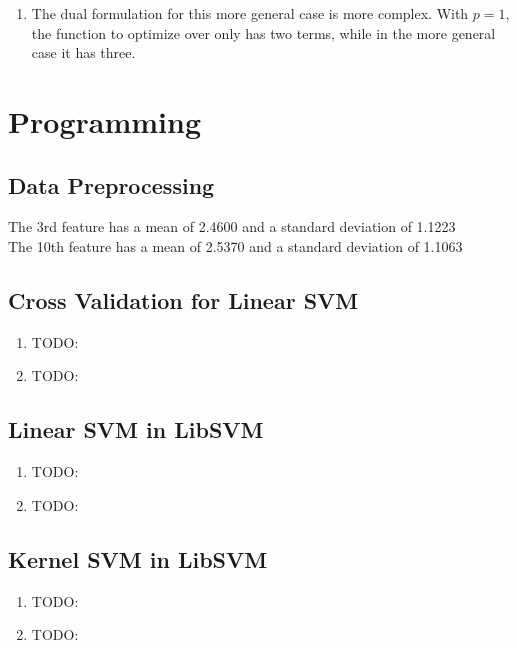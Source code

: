 \documentclass[12pt]{article}
\begin{document}
\begin{enumerate}[label=\alph*.]
	\item The dual formulation for this more general case is more complex. With $p = 1$, the function to optimize over only has two terms, while in the more general case it has three.
\end{enumerate}

\section{Programming}

\subsection{Data Preprocessing}
The 3rd feature has a mean of 2.4600 and a standard deviation of 1.1223 \\
The 10th feature has a mean of 2.5370 and a standard deviation of 1.1063 \\

\subsection{Cross Validation for Linear SVM}
\begin{enumerate}[label=\alph*.]
	\item TODO:
	\item TODO:
\end{enumerate}

\subsection{Linear SVM in LibSVM}
\begin{enumerate}[label=\alph*.]
	\item TODO:
	\item TODO:
\end{enumerate}

\subsection{Kernel SVM in LibSVM}
\begin{enumerate}[label=\alph*.]
	\item TODO:
	\item TODO:
\end{enumerate}

%
%
\end{document}
